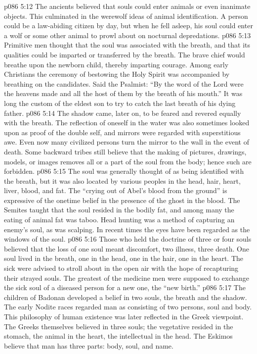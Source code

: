\vs p086 5:12 The ancients believed that souls could enter animals or even inanimate objects. This culminated in the werewolf ideas of animal identification. A person could be a law\hyp{}abiding citizen by day, but when he fell asleep, his soul could enter a wolf or some other animal to prowl about on nocturnal depredations.
\vs p086 5:13 Primitive men thought that the soul was associated with the breath, and that its qualities could be imparted or transferred by the breath. The brave chief would breathe upon the newborn child, thereby imparting courage. Among early Christians the ceremony of bestowing the Holy Spirit was accompanied by breathing on the candidates. Said the Psalmist: “By the word of the Lord were the heavens made and all the host of them by the breath of his mouth.” It was long the custom of the eldest son to try to catch the last breath of his dying father.
\vs p086 5:14 The shadow came, later on, to be feared and revered equally with the breath. The reflection of oneself in the water was also sometimes looked upon as proof of the double self, and mirrors were regarded with superstitious awe. Even now many civilized persons turn the mirror to the wall in the event of death. Some backward tribes still believe that the making of pictures, drawings, models, or images removes all or a part of the soul from the body; hence such are forbidden.
\vs p086 5:15 The soul was generally thought of as being identified with the breath, but it was also located by various peoples in the head, hair, heart, liver, blood, and fat. The “crying out of Abel’s blood from the ground” is expressive of the onetime belief in the presence of the ghost in the blood. The Semites taught that the soul resided in the bodily fat, and among many the eating of animal fat was taboo. Head hunting was a method of capturing an enemy’s soul, as was scalping. In recent times the eyes have been regarded as the windows of the soul.
\vs p086 5:16 Those who held the doctrine of three or four souls believed that the loss of one soul meant discomfort, two illness, three death. One soul lived in the breath, one in the head, one in the hair, one in the heart. The sick were advised to stroll about in the open air with the hope of recapturing their strayed souls. The greatest of the medicine men were supposed to exchange the sick soul of a diseased person for a new one, the “new birth.”
\vs p086 5:17 The children of Badonan developed a belief in two souls, the breath and the shadow. The early Nodite races regarded man as consisting of two persons, soul and body. This philosophy of human existence was later reflected in the Greek viewpoint. The Greeks themselves believed in three souls; the vegetative resided in the stomach, the animal in the heart, the intellectual in the head. The Eskimos believe that man has three parts: body, soul, and name.
